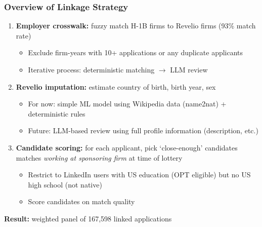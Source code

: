 \documentclass[xcolor=dvipsnames, compress, 12pt, aspectratio=169, presentation]{beamer}
\begin{document}
\begin{frame}
    \frametitle{Overview of Linkage Strategy}
    \vspace{3mm}
    \begin{enumerate}
        \item \textbf{Employer crosswalk:} fuzzy match H-1B firms to Revelio firms (93\% match rate)
        \begin{itemize}
            \item Exclude firm-years with 10+ applications or any duplicate applicants
            \item Iterative process: deterministic matching $\rightarrow$ LLM review 
        \end{itemize}
        \vspace{2mm}
        \item \textbf{Revelio imputation:} estimate country of birth, birth year, sex
        \begin{itemize}
            \item For now: simple ML model using Wikipedia data (name2nat) + deterministic rules 
            \item Future: LLM-based review using full profile information (description, etc.)
        \end{itemize}
        \vspace{2mm}
        \item \textbf{Candidate scoring:} for each applicant, pick `close-enough' candidates matches \textit{working at sponsoring firm} at time of lottery
        \begin{itemize}
            \item Restrict to LinkedIn users with US education (OPT eligible) but no US high school (not native)
            \item Score candidates on match quality
        \end{itemize}
    \end{enumerate}
    \vspace{2mm}
    \textbf{Result:} weighted panel of 167,598 linked applications
\end{frame}
\end{document}
